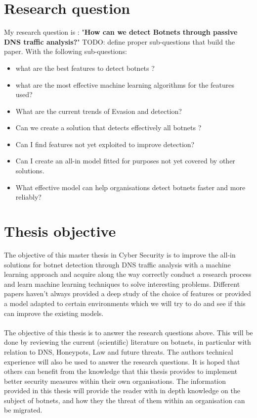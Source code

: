 \section{Research question}
My research question is : "\textbf{How can we detect Botnets through passive DNS traffic analysis?}"
TODO: define proper sub-questions that build the paper.
With the following sub-questions:
\begin{itemize}
\item what are the best features to detect botnets ?
\item what are the most effective machine learning algorithms for the features used?
\item What are the current trends of Evasion and detection?
\item Can we create a solution that detects effectively all botnets ?
\item Can I find features not yet exploited to improve detection?
\item Can I create an all-in model fitted for purposes not yet covered by other solutions.
\item What effective model can help organisations detect botnets faster and more reliably?
\end{itemize}
\section{Thesis objective}
The objective of this master thesis in Cyber Security is to improve the all-in solutions for botnet detection through DNS traffic analysis with a machine learning approach and acquire along the way correctly conduct a research process and learn machine learning techniques to solve interesting problems. Different papers haven't always provided a deep study of the choice of features or provided a model adapted to certain environments which we will try to do and see if this can improve the existing models.\\
\\
The objective of this thesis is to answer the research questions above. This will be done by reviewing the current (scientific) literature on botnets, in particular with relation to DNS, Honeypots, Law and future threats. The authors technical experience will also be used to answer the research questions. It is hoped that others can benefit from the knowledge that this thesis provides to implement
better security measures within their own organisations. The information provided in this thesis will provide the reader with in depth knowledge on the subject of botnets, and how they the threat of them within an organisation can be migrated.
\\

